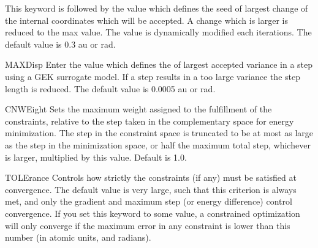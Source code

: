 \begin{keywordlist}
This keyword is followed by the value which defines the seed of largest
change of the internal coordinates which will be accepted. A
change which is larger is reduced to the max value. The value is dynamically modified each iterations.
The default value is 0.3 au or rad.
\item[MAXDisp]
Enter the value which defines the of largest
accepted variance in a step using a GEK surrogate model.
If a step results in a too large variance the step length is reduced.
The default value is 0.0005 au or rad.
\item[CNWEight]
Sets the maximum weight assigned to the fulfillment of the constraints, relative to the step taken in the
complementary space for energy minimization. The step in the constraint space is truncated to be at most as
large as the step in the minimization space, or half the maximum total step, whichever is larger, multiplied
by this value. Default is 1.0.
\item[TOLErance]
Controls how strictly the constraints (if any) must be satisfied at convergence. The default value
is very large, such that this criterion is always met, and only the gradient and maximum step (or
energy difference) control convergence. If you set this keyword to some value, a constrained optimization
will only converge if the maximum error in any constraint is lower than this number (in atomic units,
and radians).
\end{keywordlist}

